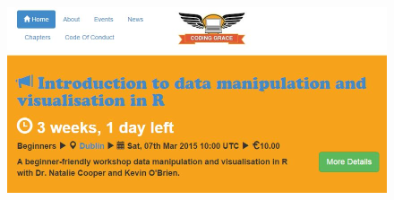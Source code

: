 \documentclass{beamer}
\begin{document}
\begin{frame}
\begin{figure}
\centering
\includegraphics[width=0.99\linewidth]{codinggraceworkshop}

\end{figure}

\end{frame}
\end{document}
